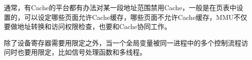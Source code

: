 通常，有Cache的平台都有办法对某一段地址范围禁用Cache，一般是在页表中设置的，可以设定哪些页面允许Cache缓存，哪些页面不允许Cache缓存，MMU不仅要做地址转换和访问权限检查，也要和Cache协同工作。



除了设备寄存器需要用限定之外，当一个全局变量被同一进程中的多个控制流程访问时也要用限定，比如信号处理函数和多线程。

